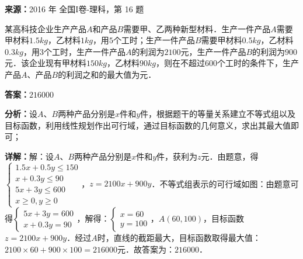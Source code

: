 \begin{question}[points=5]
\textbf{来源：}2016 年 全国I卷-理科，第 16 题\par
某高科技企业生产产品$A$和产品$B$需要甲、乙两种新型材料．生产一件产品$A$需要甲材料$1.5kg$，乙材料$1kg$，用$5$个工时；生产一件产品$B$需要甲材料$0.5kg$，乙材料$0.3kg$，用$3$个工时，生产一件产品$A$的利润为$2100$元，生产一件产品$B$的利润为$900$元．该企业现有甲材料$150kg$，乙材料$90kg$，则在不超过$600$个工时的条件下，生产产品$A$、产品$B$的利润之和的最大值为元．
\fillin[{$216000$}]
\begin{solution}
\textbf{答案：}$216000$

\textbf{分析：}设$A$、$B$两种产品分别是$x$件和$y$件，根据题干的等量关系建立不等式组以及目标函数，利用线性规划作出可行域，通过目标函数的几何意义，求出其最大值即可；

\textbf{详解：}解：设$A$、$B$两种产品分别是$x$件和$y$件，获利为$z$元．由题意，得$\begin{cases}1.5x+0.5y\le150\\x+0.3y\le90\\5x+3y\le600\\x\ge0,y\ge0\end{cases}$，$z=2100x+900y$．不等式组表示的可行域如图：由题意可得$\begin{cases}5x+3y=600\\x+0.3y=90\end{cases}$，解得：$\begin{cases}x=60\\y=100\end{cases}$，$A(60,100)$，目标函数$z=2100x+900y$．经过$A$时，直线的截距最大，目标函数取得最大值：$2100\times60+900\times100=216000$元．故答案为：$216000$．
\end{solution}
\end{question}

